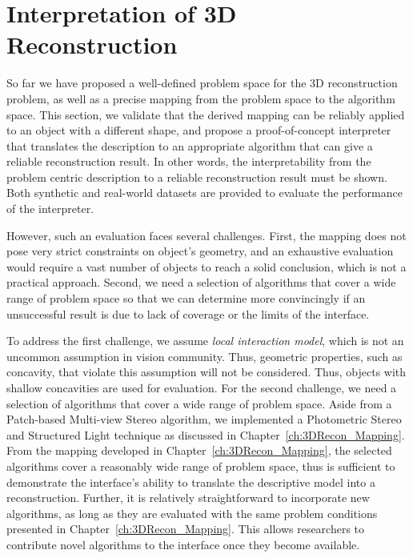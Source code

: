 
\chapter{Interpretation of 3D Reconstruction}
\label{ch:3DRecon_Interp}
So far we have proposed a well-defined problem space for the 3D reconstruction problem, as well as a precise mapping from the problem space to the algorithm space. This section, we validate that the derived mapping can be reliably applied to an object with a different shape, and propose a proof-of-concept interpreter that translates the description to an appropriate algorithm that can give a reliable reconstruction result. In other words, the interpretability from the problem centric description to a reliable reconstruction result must be shown. Both synthetic and real-world datasets are provided to evaluate the performance of the interpreter.

However, such an evaluation faces several challenges. First, the mapping does not pose very strict constraints on object's geometry, and an exhaustive evaluation would require a vast number of objects to reach a solid conclusion, which is not a practical approach. Second, we need a selection of algorithms that cover a wide range of problem space so that we can determine more convincingly if an unsuccessful result is due to lack of coverage or the limits of the interface.

To address the first challenge, we assume \textit{local interaction model}, which is not an uncommon assumption in vision community. Thus, geometric properties, such as concavity, that violate this assumption will not be considered. Thus, objects with shallow concavities are used for evaluation. For the second challenge, we need a selection of algorithms that cover a wide range of problem space. Aside from a Patch-based Multi-view Stereo algorithm, we implemented a Photometric Stereo and Structured Light technique as discussed in Chapter~\ref{ch:3DRecon_Mapping}. From the mapping developed in Chapter~\ref{ch:3DRecon_Mapping}, the selected algorithms cover a reasonably wide range of problem space, thus is sufficient to demonstrate the interface's ability to translate the descriptive model into a reconstruction. Further, it is relatively straightforward to incorporate new algorithms, as long as they are evaluated with the same problem conditions presented in Chapter~\ref{ch:3DRecon_Mapping}. This allows researchers to contribute novel algorithms to the interface once they become available.

